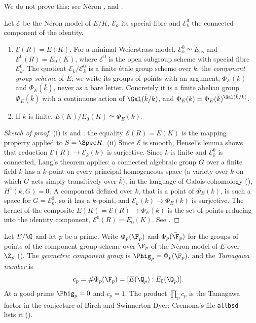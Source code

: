We do not prove this; see N\'eron \cite{NeronModels}, \cite[Sections 1.2, 1.4]{BLR} and
\cite[IV.5, IV.6]{SilvermanATAEC}.

\begin{proposition}\label{prop:reduction:component-group}
Let $\mathcal E$ be the N\'eron model of $E/K$, $\mathcal E_k$ its special fibre and $\mathcal E_k^0$ the connected
component of the identity.
\begin{enumerate}[label=(\roman*)]
\item $\mathcal E(R)=E(K)$. For a minimal Weierstrass model, $\mathcal E_k^0\simeq\tilde E_{\mathrm{ns}}$ and
$\mathcal E^0(R)=E_0(K)$, where $\mathcal E^0$ is the open subgroup scheme with special fibre $\mathcal E_k^0$. The quotient
$\mathcal E_k/\mathcal E_k^0$ is a finite \'etale group scheme over $k$, the \emph{component group scheme} of $E$; we write its
groups of points with an argument, $\Phi_E(k)$ and $\Phi_E(\bar k)$, never as a bare letter. Concretely it is a finite abelian
group $\Phi_E(\bar k)$ with a continuous action of $\Gal(\bar k/k)$, and $\Phi_E(k)=\Phi_E(\bar k)^{\Gal(\bar k/k)}$.
\item If $k$ is finite, $E(K)/E_0(K)\simeq\Phi_E(k)$.
\end{enumerate}
\end{proposition}

\begin{proof}[Sketch of proof]
(i) is \cite[IV.5, IV.9]{SilvermanATAEC} and \cite[Section 7.1]{BLR}; the equality $\mathcal E(R)=E(K)$ is the mapping
property applied to $S=\Spec R$. (ii) Since $\mathcal E$ is smooth, Hensel's lemma shows that reduction
$\mathcal E(R)\to\mathcal E_k(k)$ is surjective. Since $k$ is finite and $\mathcal E_k^0$ is connected, Lang's theorem applies: a connected algebraic group $G$ over a
finite field $k$ has a $k$-point on every principal homogeneous space (a variety over $k$ on which $G$ acts simply
transitively over $\bar k$); in the language of Galois cohomology (), $H^1(k,G)=0$. A component
defined over $k$, that is a point of $\Phi_E(k)$, is such a space for $G=\mathcal E_k^0$, so it has a $k$-point, and
$\mathcal E_k(k)\to\Phi_E(k)$ is surjective. The kernel of the composite
$E(K)=\mathcal E(R)\to\Phi_E(k)$ is the set of points reducing into the identity component, $\mathcal E^0(R)=E_0(K)$. See
\cite[IV.9]{SilvermanATAEC}.
\end{proof}

\begin{definition}\label{def:reduction:tamagawa}
Let $E/\Q$ and let $p$ be a prime. Write $\Phi_p(\F_p)$ and $\Phi_p(\bar\F_p)$ for the groups of points of the component group
scheme over $\F_p$ of the N\'eron model of $E$ over $\Z_p$ (). The
\emph{geometric component group} is $\Phig_p=\Phi_p(\bar\F_p)$, and the \emph{Tamagawa number} is
\[
c_p=\#\Phi_p(\F_p)=[E(\Q_p):E_0(\Q_p)].
\]
At a good prime $\Phig_p=0$ and $c_p=1$. The product $\prod_pc_p$ is the Tamagawa factor in the conjecture of
Birch and Swinnerton-Dyer; Cremona's file \texttt{allbsd} lists it ().
\end{definition}


